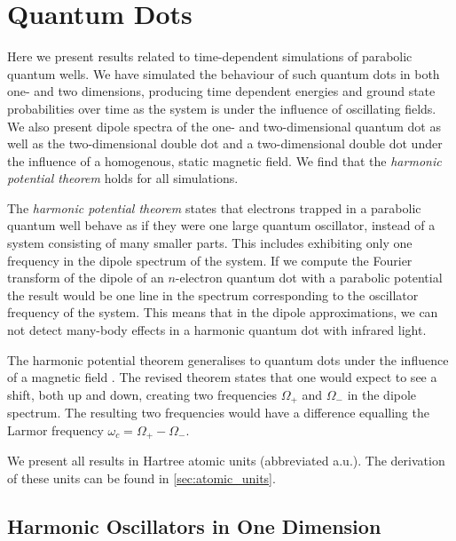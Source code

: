 \chapter{Quantum Dots}
\label{ch:quantum_dots}

Here we present results related to time-dependent simulations of parabolic quantum
wells. We have simulated the behaviour of such quantum dots in both one- and two 
dimensions, producing time dependent energies and ground state probabilities over
time as the system is under the influence of oscillating fields. We also present 
dipole spectra of the one- and two-dimensional quantum dot as well as the 
two-dimensional double dot and a two-dimensional double dot under the influence of
a homogenous, static magnetic field. We find that the \emph{harmonic potential theorem}
holds for all simulations.

The \emph{harmonic potential theorem} \cite{kohn1961cyclotron}
states that electrons trapped in a parabolic quantum well behave as if they were 
one large quantum oscillator, instead of a system consisting of many smaller parts.
This includes exhibiting only one frequency in the dipole spectrum of the system.
If we compute the Fourier transform of the dipole of an $n$-electron quantum dot with 
a parabolic potential the result would be one line in the spectrum corresponding to the
oscillator frequency of the system. This means that in the dipole approximations,
we can not detect many-body effects in a harmonic quantum dot with infrared light.

The harmonic potential theorem generalises to quantum dots under the influence 
of a magnetic field \cite{brey1989optical,lai2016generalized}.
The revised theorem states that one would expect to see a shift,
both up and down, creating two frequencies $\Omega_+$ and $\Omega_-$ in the dipole 
spectrum. The resulting two frequencies would have a difference 
equalling the Larmor frequency $\omega_c = \Omega_+ - \Omega_-$.

We present all results in Hartree atomic units (abbreviated a.u.). The derivation of these
units can be found in \autoref{sec:atomic_units}.

\section{Harmonic Oscillators in One Dimension}


